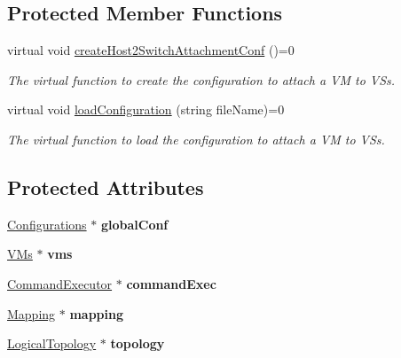 \subsection*{\-Protected \-Member \-Functions}
\begin{DoxyCompactItemize}
\item 
\hypertarget{classAbstractVM_a450de03613b97f51a47b478c5c1de740}{virtual void \hyperlink{classAbstractVM_a450de03613b97f51a47b478c5c1de740}{create\-Host2\-Switch\-Attachment\-Conf} ()=0}\label{classAbstractVM_a450de03613b97f51a47b478c5c1de740}

\begin{DoxyCompactList}\small\item\em \-The virtual function to create the configuration to attach a \-V\-M to \-V\-Ss. \end{DoxyCompactList}\item 
\hypertarget{classAbstractVM_ab7ba98a86457d54707fd8873e14639a7}{virtual void \hyperlink{classAbstractVM_ab7ba98a86457d54707fd8873e14639a7}{load\-Configuration} (string file\-Name)=0}\label{classAbstractVM_ab7ba98a86457d54707fd8873e14639a7}

\begin{DoxyCompactList}\small\item\em \-The virtual function to load the configuration to attach a \-V\-M to \-V\-Ss. \end{DoxyCompactList}\end{DoxyCompactItemize}
\subsection*{\-Protected \-Attributes}
\begin{DoxyCompactItemize}
\item 
\hypertarget{classAbstractVM_a2348002e7601209dbe0b44ef4ca09ebf}{\hyperlink{classConfigurations}{\-Configurations} $\ast$ {\bfseries global\-Conf}}\label{classAbstractVM_a2348002e7601209dbe0b44ef4ca09ebf}

\item 
\hypertarget{classAbstractVM_a7d372673dd5290d54c0a69617d44450e}{\hyperlink{classVMs}{\-V\-Ms} $\ast$ {\bfseries vms}}\label{classAbstractVM_a7d372673dd5290d54c0a69617d44450e}

\item 
\hypertarget{classAbstractVM_a830c02a6ce199af8ebb300ea1da1ebda}{\hyperlink{classCommandExecutor}{\-Command\-Executor} $\ast$ {\bfseries command\-Exec}}\label{classAbstractVM_a830c02a6ce199af8ebb300ea1da1ebda}

\item 
\hypertarget{classAbstractVM_a422b34730b41dcc5f23e0ec5b0c9f6cb}{\hyperlink{classMapping}{\-Mapping} $\ast$ {\bfseries mapping}}\label{classAbstractVM_a422b34730b41dcc5f23e0ec5b0c9f6cb}

\item 
\hypertarget{classAbstractVM_a203102eb0404f3464baaf7288bcf3722}{\hyperlink{classLogicalTopology}{\-Logical\-Topology} $\ast$ {\bfseries topology}}\label{classAbstractVM_a203102eb0404f3464baaf7288bcf3722}

\end{DoxyCompactItemize}
